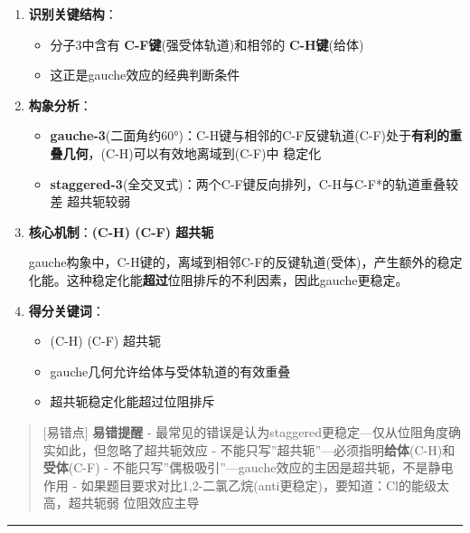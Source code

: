 \begin{enumerate}
\def\labelenumi{\arabic{enumi}.}
\item
  \textbf{识别关键结构}：

  \begin{itemize}
  \tightlist
  \item
    分子3中含有 \textbf{C-F键}(强受体轨道)和相邻的 \textbf{C-H键}(给体)
  \item
    这正是gauche效应的经典判断条件
  \end{itemize}
\item
  \textbf{构象分析}：

  \begin{itemize}
  \tightlist
  \item
    \textbf{gauche-3}(二面角约60°)：C-H键与相邻的C-F反键轨道(C-F)处于\textbf{有利的重叠几何}，(C-H)可以有效地离域到(C-F)中 \箭 稳定化
  \item
    \textbf{staggered-3}(全交叉式)：两个C-F键反向排列，C-H与C-F*的轨道重叠较差 \箭 超共轭较弱
  \end{itemize}
\item
  \textbf{核心机制}：\textbf{(C-H) \箭 (C-F) 超共轭}

  gauche构象中，C-H键的，离域到相邻C-F的反键轨道(受体)，产生额外的稳定化能。这种稳定化能\textbf{超过}位阻排斥的不利因素，因此gauche更稳定。
\item
  \textbf{得分关键词}：

  \begin{itemize}
  \tightlist
  \item
    (C-H) \箭 (C-F) 超共轭
  \item
    gauche几何允许给体与受体轨道的有效重叠
  \item
    超共轭稳定化能超过位阻排斥
  \end{itemize}
\end{enumerate}

\begin{quote}
{[}易错点{]} \textbf{易错提醒}
- 最常见的错误是认为staggered更稳定---仅从位阻角度确实如此，但忽略了超共轭效应
- 不能只写''超共轭''---必须指明\textbf{给体}( C-H)和\textbf{受体}( C-F)
- 不能只写''偶极吸引''---gauche效应的主因是超共轭，不是静电作用
- 如果题目要求对比1,2-二氯乙烷(anti更稳定)，要知道：Cl的能级太高，超共轭弱 \箭 位阻效应主导
\end{quote}

\begin{center}\rule{0.5\linewidth}{0.5pt}\end{center}

